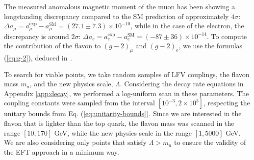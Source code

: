 \documentclass[prd,amsfonts,onecolumn,superscriptaddress,aps,nofootinbib,11pt]{revtex4-1}
\begin{document}
The measured anomalous magnetic moment of the muon has been showing a longstanding discrepancy compared to the SM prediction of approximately $4\sigma$: $\Delta a_\mu = a_\mu^{\mathrm{exp}}-a_\mu^{\mathrm{SM}}=(27.1\pm 7.3)\times 10^{-10}$, while in the case of the electron, the discrepancy is around $2\sigma$: $\Delta a_e = a_e^{\mathrm{exp}}-a_e^{\mathrm{SM}}=(-87\pm 36)\times 10^{-14}$. To compute the contribution of the flavon to $(g-2)_\mu$ and $(g-2)_e$, we use the formulas (\ref{eq:g-2}), deduced in~\cite{Cornella:2019uxs}. 


To search for viable points, we take random samples of LFV couplings, the flavon mass $m_a$, and the new physics scale, $\Lambda$. Considering the decay rate equations in Appendix \ref{app:decay}, we performed a log-uniform scan in these parameters. The coupling constants were sampled from the interval $[10^{-3}, 2\times10^3]$, respecting the unitary bounds from Eq. (\ref{eq:unitarity-bounds}). Since we are interested in the flavon that is lighter than the top quark, the flavon mass was scanned in the range $[10, 170]$ GeV, while the new physics scale in the range $[1, 5000]$ GeV. We are also considering only points that satisfy $\Lambda > m_a$ to ensure the validity of the EFT approach in a minimum way.
\end{document}
